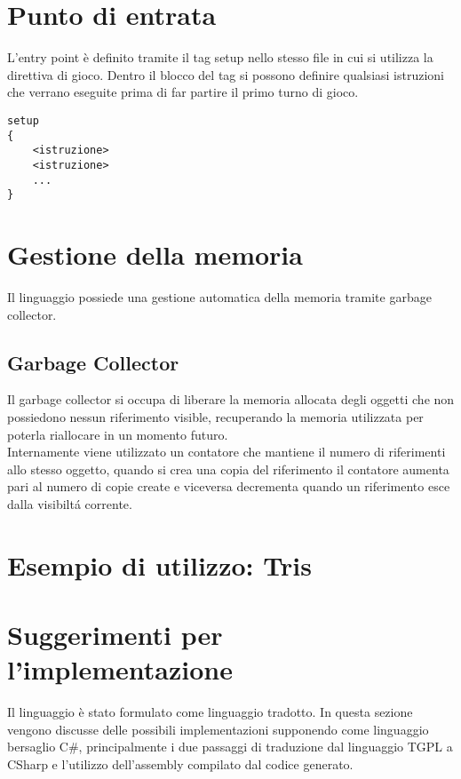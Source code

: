 \section{Punto di entrata}
L'entry point è definito tramite il tag setup nello stesso file in cui 
si utilizza la direttiva di gioco.
Dentro il blocco del tag si possono definire qualsiasi istruzioni che verrano eseguite
prima di far partire il primo turno di gioco.
\begin{lstlisting}
setup 
{
    <istruzione>
    <istruzione>
    ...
}
\end{lstlisting}

\section{Gestione della memoria}
Il linguaggio possiede una gestione automatica della memoria tramite garbage collector.

\subsection{Garbage Collector}
Il garbage collector si occupa di liberare la memoria allocata degli oggetti
che non possiedono nessun riferimento visible, recuperando la memoria utilizzata
per poterla riallocare in un momento futuro. \\ 
Internamente viene utilizzato un contatore che mantiene il numero di riferimenti 
allo stesso oggetto, quando si crea una copia del riferimento il contatore aumenta
pari al numero di copie create e viceversa decrementa quando un riferimento 
esce dalla visibiltá corrente.

\section{Esempio di utilizzo: Tris}
\begin{mdframed}[
    backgroundcolor=light-gray, 
    roundcorner=10pt,leftmargin=1, 
    rightmargin=1,
    innerleftmargin=15, 
    innertopmargin=15,
    innerbottommargin=15, 
    outerlinewidth=1, 
    linecolor=light-gray]

\end{mdframed}

\section{Suggerimenti per l'implementazione}
Il linguaggio è stato formulato come linguaggio tradotto. 
In questa sezione vengono discusse delle possibili implementazioni 
supponendo come linguaggio bersaglio C\#, principalmente i due passaggi di 
traduzione dal linguaggio TGPL a CSharp e l'utilizzo dell'assembly compilato dal
codice generato.

